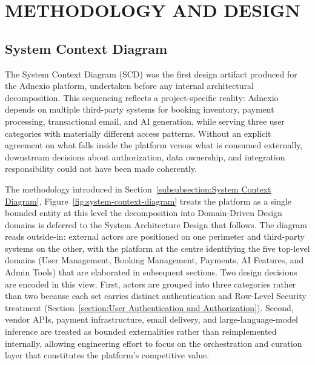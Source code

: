 \chapter{METHODOLOGY AND DESIGN}
\label{chapter:METHODOLOGY AND DESIGN}

\section{System Context Diagram}
The System Context Diagram (SCD) was the first design artifact produced for the Adnexio platform, undertaken before any internal architectural decomposition. This sequencing reflects a project-specific reality: Adnexio depends on multiple third-party systems for booking inventory, payment processing, transactional email, and AI generation, while serving three user categories with materially different access patterns. Without an explicit agreement on what falls inside the platform versus what is consumed externally, downstream decisions about authorization, data ownership, and integration responsibility could not have been made coherently.

The methodology introduced in Section~\ref{subsubsection:System Context Diagram}, Figure~\ref{fig:system-context-diagram} treats the platform as a single bounded entity at this level the decomposition into Domain-Driven Design domains is deferred to the System Architecture Design that follows. The diagram reads outside-in: external actors are positioned on one perimeter and third-party systems on the other, with the platform at the centre identifying the five top-level domains (User Management, Booking Management, Payments, AI Features, and Admin Tools) that are elaborated in subsequent sections. Two design decisions are encoded in this view. First, actors are grouped into three categories rather than two because each set carries distinct authentication and Row-Level Security treatment (Section~\ref{section:User Authentication and Authorization}). Second, vendor APIs, payment infrastructure, email delivery, and large-language-model inference are treated as bounded externalities rather than reimplemented internally, allowing engineering effort to focus on the orchestration and curation layer that constitutes the platform's competitive value.

\newpage
